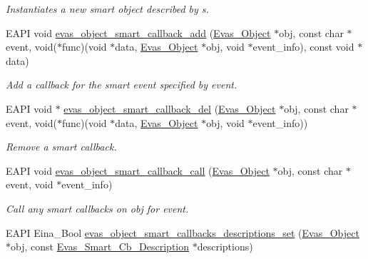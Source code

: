 \begin{DoxyCompactItemize}
\begin{DoxyCompactList}\small\item\em Instantiates a new smart object described by {\ttfamily s}. \item\end{DoxyCompactList}\item 
EAPI void \hyperlink{group__Evas__Smart__Object__Group_ga13db802166db6890fe25bf63143ad3ee}{evas\_\-object\_\-smart\_\-callback\_\-add} (\hyperlink{group__Evas__Object__Group_ga9e19e6dd1f517a0ba437c0114d3e7c97}{Evas\_\-Object} $\ast$obj, const char $\ast$event, void($\ast$func)(void $\ast$data, \hyperlink{group__Evas__Object__Group_ga9e19e6dd1f517a0ba437c0114d3e7c97}{Evas\_\-Object} $\ast$obj, void $\ast$event\_\-info), const void $\ast$data)
\begin{DoxyCompactList}\small\item\em Add a callback for the smart event specified by {\ttfamily event}. \item\end{DoxyCompactList}\item 
EAPI void $\ast$ \hyperlink{group__Evas__Smart__Object__Group_gab1f7248ecf036480e0fa2d1ca4e91c35}{evas\_\-object\_\-smart\_\-callback\_\-del} (\hyperlink{group__Evas__Object__Group_ga9e19e6dd1f517a0ba437c0114d3e7c97}{Evas\_\-Object} $\ast$obj, const char $\ast$event, void($\ast$func)(void $\ast$data, \hyperlink{group__Evas__Object__Group_ga9e19e6dd1f517a0ba437c0114d3e7c97}{Evas\_\-Object} $\ast$obj, void $\ast$event\_\-info))
\begin{DoxyCompactList}\small\item\em Remove a smart callback. \item\end{DoxyCompactList}\item 
EAPI void \hyperlink{group__Evas__Smart__Object__Group_ga17bbe660f5bf9d8997913b08882f6f9e}{evas\_\-object\_\-smart\_\-callback\_\-call} (\hyperlink{group__Evas__Object__Group_ga9e19e6dd1f517a0ba437c0114d3e7c97}{Evas\_\-Object} $\ast$obj, const char $\ast$event, void $\ast$event\_\-info)
\begin{DoxyCompactList}\small\item\em Call any smart callbacks on {\ttfamily obj} for {\ttfamily event}. \item\end{DoxyCompactList}\item 
EAPI Eina\_\-Bool \hyperlink{group__Evas__Smart__Object__Group_gaf724dbb075cdaf2b4b44dd883b792dc3}{evas\_\-object\_\-smart\_\-callbacks\_\-descriptions\_\-set} (\hyperlink{group__Evas__Object__Group_ga9e19e6dd1f517a0ba437c0114d3e7c97}{Evas\_\-Object} $\ast$obj, const \hyperlink{struct__Evas__Smart__Cb__Description}{Evas\_\-Smart\_\-Cb\_\-Description} $\ast$descriptions)

\end{DoxyCompactItemize}
